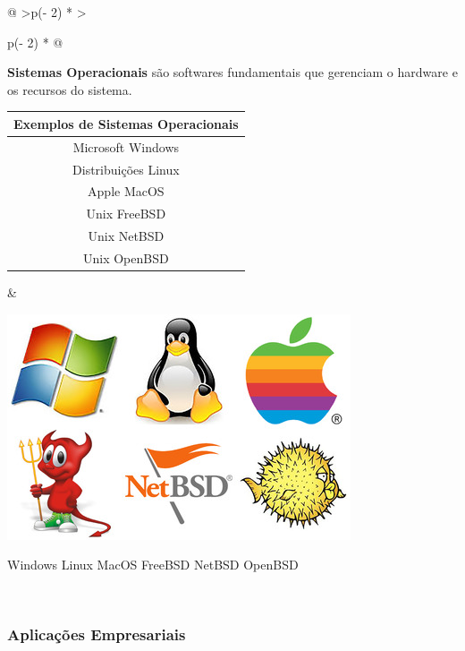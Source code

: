 \documentclass[
]{book}
\begin{document}
\begin{longtable}[]{@{}
  >{\centering\arraybackslash}p{(\columnwidth - 2\tabcolsep) * }
  >{\raggedright\arraybackslash}p{(\columnwidth - 2\tabcolsep) * }@{}}
\toprule\noalign{}
\endhead
\bottomrule\noalign{}
\endlastfoot
\begin{minipage}[t]{\linewidth}\centering
\textbf{Sistemas Operacionais} são softwares fundamentais que gerenciam o hardware e os recursos do sistema.

\begin{longtable}[]{@{}c@{}}
\toprule\noalign{}
Exemplos de Sistemas Operacionais \\
\midrule\noalign{}
\endhead
\bottomrule\noalign{}
\endlastfoot
Microsoft Windows \\
Distribuições Linux \\
Apple MacOS \\
Unix FreeBSD \\
Unix NetBSD \\
Unix OpenBSD \\
\end{longtable}
\end{minipage} & \begin{minipage}[t]{\linewidth}\raggedright
\begin{center}
\includegraphics{images/InfraEstrutura/software/so.jpg}

Windows Linux MacOS FreeBSD NetBSD OpenBSD
\end{center}
\end{minipage} \\
\end{longtable}

\subsubsection{Aplicações Empresariais}\label{aplicauxe7uxf5es-empresariais}
\end{document}
